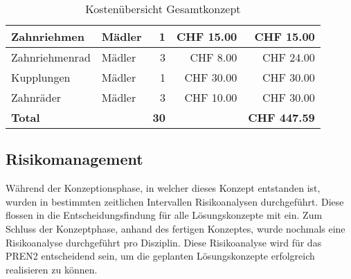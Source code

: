 \documentclass[../../main.tex]{subfiles}
\begin{document}
\begin{table}[H]
\begin{tabular}{|p{6cm}|l|r|r|r|}
    Zahnriehmen                                             & Mädler             & 1               & CHF 15.00           & CHF 15.00             \\ \hline \nocite{MadlerZahnriemen}
    Zahnriehmenrad                                          & Mädler             & 3               & CHF 8.00            & CHF 24.00             \\ \hline \nocite{MadlerZahnriemenrad}
    Kupplungen                                              & Mädler             & 1               & CHF 30.00           & CHF 30.00             \\ \hline \nocite{MadlerKupplung}
    Zahnräder                                               & Mädler             & 3               & CHF 10.00           & CHF 30.00             \\ \hline \hline \nocite{MadlerZahnrad}
    \textbf{Total}                                          & \textbf{}          & \textbf{30}     & \textbf{}           & \textbf{CHF 447.59}   \\ \hline
    \end{tabular}
    \caption{Kostenübersicht Gesamtkonzept}
    \label{tab:kosten_total}
    \end{table}

\pagebreak

\subsection{Risikomanagement}
Während der Konzeptionsphase, in welcher dieses Konzept entstanden ist, wurden in bestimmten zeitlichen Intervallen Risikoanalysen durchgeführt. Diese flossen in die Entscheidungsfindung für alle Lösungskonzepte mit ein. Zum Schluss der Konzeptphase, anhand des fertigen Konzeptes, wurde nochmals eine Risikoanalyse durchgeführt pro Disziplin. Diese Risikoanalyse wird für das PREN2 entscheidend sein, um die geplanten Lösungskonzepte erfolgreich realisieren zu können.
\end{document}
